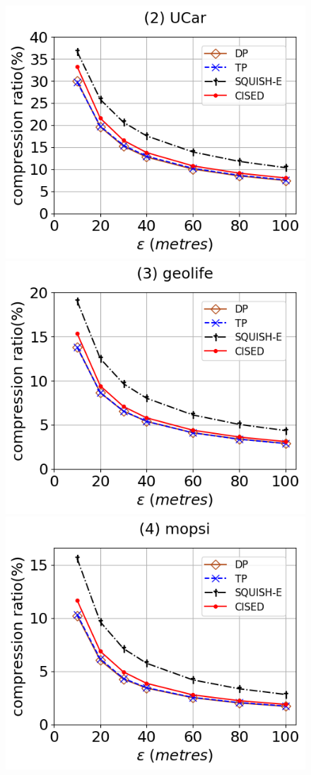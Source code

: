 {\begin{figure}[h]
	\centering
	\includegraphics[scale=0.15]{Figures/Exp-SED-CR-epsilon-service.png}	
	\includegraphics[scale=0.15]{Figures/Exp-SED-CR-epsilon-geolife.png}	
	\includegraphics[scale=0.15]{Figures/Exp-SED-CR-epsilon-mopsi.png}	

\end{figure}}
